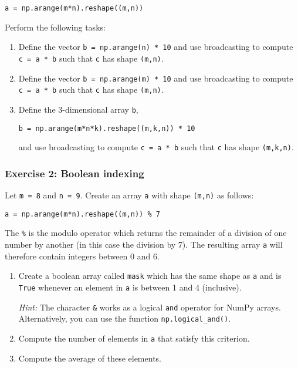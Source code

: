 \documentclass{scrartcl}
\begin{document}
\begin{verbatim}
a = np.arange(m*n).reshape((m,n))
\end{verbatim}

Perform the following tasks:

\begin{enumerate}
\def\labelenumi{\arabic{enumi}.}
\item
  Define the vector \texttt{b\ =\ np.arange(n)\ *\ 10} and use
  broadcasting to compute \texttt{c\ =\ a\ *\ b} such that \texttt{c}
  has shape \texttt{(m,n)}.
\item
  Define the vector \texttt{b\ =\ np.arange(m)\ *\ 10} and use
  broadcasting to compute \texttt{c\ =\ a\ *\ b} such that \texttt{c}
  has shape \texttt{(m,n)}.
\item
  Define the 3-dimensional array \texttt{b},

\begin{verbatim}
b = np.arange(m*n*k).reshape((m,k,n)) * 10
\end{verbatim}

  and use broadcasting to compute \texttt{c\ =\ a\ *\ b} such that
  \texttt{c} has shape \texttt{(m,k,n)}.
\end{enumerate}

    \hypertarget{exercise-2-boolean-indexing}{%
\subsubsection{Exercise 2: Boolean
indexing}\label{exercise-2-boolean-indexing}}

Let \texttt{m\ =\ 8} and \texttt{n\ =\ 9}. Create an array \texttt{a}
with shape \texttt{(m,n)} as follows:

\begin{verbatim}
a = np.arange(m*n).reshape((m,n)) % 7
\end{verbatim}

The \texttt{\%} is the modulo operator which returns the remainder of a
division of one number by another (in this case the division by 7). The
resulting array \texttt{a} will therefore contain integers between 0 and
6.

\begin{enumerate}
\def\labelenumi{\arabic{enumi}.}
\item
  Create a boolean array called \texttt{mask} which has the same shape
  as \texttt{a} and is \texttt{True} whenever an element in \texttt{a}
  is between 1 and 4 (inclusive).

  \emph{Hint:} The character \texttt{\&} works as a logical \texttt{and}
  operator for NumPy arrays. Alternatively, you can use the function
  \texttt{np.logical\_and()}.
\item
  Compute the number of elements in \texttt{a} that satisfy this
  criterion.
\item
  Compute the average of these elements.
\end{enumerate}
\end{document}
